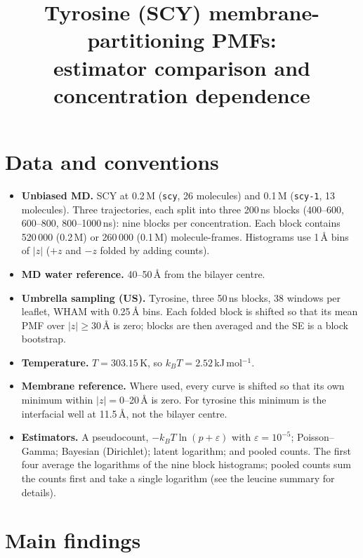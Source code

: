 \documentclass[11pt,a4paper]{article}
\title{Tyrosine (SCY) membrane-partitioning PMFs:\\
estimator comparison and concentration dependence}
\date{}
\newcommand{\kJ}{\,kJ\,mol$^{-1}$}
\begin{document}
\maketitle

\section{Data and conventions}

\begin{itemize}
  \item \textbf{Unbiased MD.} SCY at 0.2\,M (\texttt{scy}, 26 molecules) and 0.1\,M
  (\texttt{scy-1}, 13 molecules). Three trajectories, each split into three 200\,ns blocks
  (400--600, 600--800, 800--1000\,ns): nine blocks per concentration. Each block contains
  520\,000 (0.2\,M) or 260\,000 (0.1\,M) molecule-frames. Histograms use 1\,\AA{} bins of
  $|z|$ ($+z$ and $-z$ folded by adding counts).
  \item \textbf{MD water reference.} 40--50\,\AA{} from the bilayer centre.
  \item \textbf{Umbrella sampling (US).} Tyrosine, three 50\,ns blocks, 38 windows per
  leaflet, WHAM with 0.25\,\AA{} bins. Each folded block is shifted so that its mean PMF over
  $|z|\ge 30$\,\AA{} is zero; blocks are then averaged and the SE is a block bootstrap.
  \item \textbf{Temperature.} $T = 303.15$\,K, so $k_BT = 2.52$\kJ.
  \item \textbf{Membrane reference.} Where used, every curve is shifted so that its own minimum
  within $|z| = 0$--20\,\AA{} is zero. For tyrosine this minimum is the interfacial well at
  11.5\,\AA, not the bilayer centre.
  \item \textbf{Estimators.} A pseudocount, $-k_BT\ln(p+\varepsilon)$ with
  $\varepsilon = 10^{-5}$; Poisson--Gamma; Bayesian (Dirichlet); latent logarithm; and pooled
  counts. The first four average the logarithms of the nine block histograms; pooled counts
  sum the counts first and take a single logarithm (see the leucine summary for details).
\end{itemize}

\section{Main findings}
\end{document}
